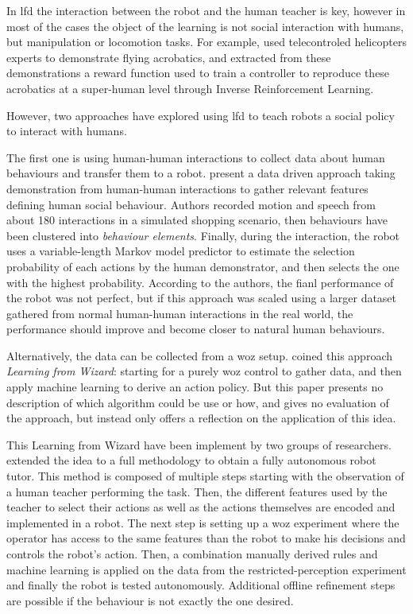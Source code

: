 	In \gls{lfd} the interaction between the robot and the human teacher is key, however in most of the cases the object of the learning is not social interaction with humans, but manipulation or locomotion tasks. For example, \cite{abbeel2004apprenticeship} used telecontroled helicopters experts to demonstrate flying acrobatics, and extracted from these demonstrations a reward function used to train a controller to reproduce these acrobatics at a super-human level through Inverse Reinforcement Learning. %
	
	However, two approaches have explored using \gls{lfd} to teach robots a social policy to interact with humans.
	
	The first one is using human-human interactions to collect data about human behaviours and transfer them to a robot. \citet{liu2014train} present a data driven approach taking demonstration from human-human interactions to gather relevant features defining human social behaviour. Authors recorded motion and speech from about 180 interactions in a simulated shopping scenario, then behaviours have been clustered into \emph{behaviour elements}. Finally, during the interaction, the robot uses a variable-length Markov model predictor to estimate the selection probability of each actions by the human demonstrator, and then selects the one with the highest probability. According to the authors, the fianl performance of the robot was not perfect, but if this approach was scaled using a larger dataset gathered from normal human-human interactions in the real world, the performance should improve and become closer to natural human behaviours.
    
    Alternatively, the data can be collected from a \acrlong{woz} setup. \citep{knox2014learning} coined this approach \emph{Learning from Wizard}: starting for a purely \gls{woz} control to gather data, and then apply machine learning to derive an action policy. But this paper presents no description of which algorithm could be use or how, and gives no evaluation of the approach, but instead only offers a reflection on the application of this idea.
    
    This Learning from Wizard have been implement by two groups of researchers. \citet{sequeira2016discovering} extended the idea to a full methodology to obtain a fully autonomous robot tutor. This method is composed of multiple steps starting with the observation of a human teacher performing the task. Then, the different features used by the teacher to select their actions as well as the actions themselves are encoded and implemented in a robot. The next step is setting up a \gls{woz} experiment where the operator has access to the same features than the robot to make his decisions and controls the robot's action. Then, a combination manually derived rules and machine learning is applied on the data from the restricted-perception experiment and finally the robot is tested autonomously. Additional offline refinement steps are possible if the behaviour is not exactly the one desired. 
    
